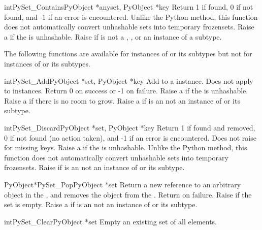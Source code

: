 \begin{cfuncdesc}{int}{PySet_Contains}{PyObject *anyset, PyObject *key}
  Return 1 if found, 0 if not found, and -1 if an error is
  encountered.  Unlike the Python  method, this
  function does not automatically convert unhashable sets into temporary
  frozensets.  Raise a  if the  is unhashable.
  Raise  if  is not a ,
  , or an instance of a subtype.
\end{cfuncdesc}

The following functions are available for instances of  or
its subtypes but not for instances of  or its subtypes.

\begin{cfuncdesc}{int}{PySet_Add}{PyObject *set, PyObject *key}
  Add  to a  instance.  Does not apply to
   instances.  Return 0 on success or -1 on failure.
  Raise a  if the  is unhashable.
  Raise a  if there is no room to grow.
  Raise a  if  is an not an instance
  of  or its subtype.
\end{cfuncdesc}

\begin{cfuncdesc}{int}{PySet_Discard}{PyObject *set, PyObject *key}
  Return 1 if found and removed, 0 if not found (no action taken),
  and -1 if an error is encountered.  Does not raise 
  for missing keys.  Raise a  if the  is
  unhashable.  Unlike the Python  method, this function
  does not automatically convert unhashable sets into temporary frozensets.
  Raise  if  is an not an instance
  of  or its subtype.
\end{cfuncdesc}

\begin{cfuncdesc}{PyObject*}{PySet_Pop}{PyObject *set}
  Return a new reference to an arbitrary object in the ,
  and removes the object from the .  Return \NULL{} on
  failure.  Raise  if the set is empty.
  Raise a  if  is an not an instance
  of  or its subtype.
\end{cfuncdesc}

\begin{cfuncdesc}{int}{PySet_Clear}{PyObject *set}
  Empty an existing set of all elements.
\end{cfuncdesc}
